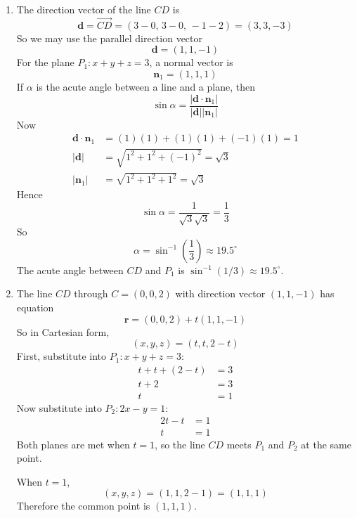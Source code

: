 \documentclass[leqno]{article}
\begin{document}
\begin{enumerate}[
  label=\textbf{\arabic*.},
  leftmargin=*,
  topsep=0pt,
  partopsep=0pt,
  parsep=0pt
]
\begin{tcolorbox}[colback=white, colframe=scarlet, title={\textbf{Solution}}, breakable, grow to left by=6mm, grow to right by=10mm]
\begin{enumerate}[label=\textbf{(\alph*)}]
  \item The direction vector of the line $CD$ is
\[
\mathbf d=\overrightarrow{CD}=(3-0,\,3-0,\,-1-2)=(3,3,-3)
\]
So we may use the parallel direction vector
\[
\mathbf d=(1,1,-1)
\]
For the plane $P_1:x+y+z=3$, a normal vector is
\[
\mathbf n_1=(1,1,1)
\]
If $\alpha$ is the acute angle between a line and a plane, then
\[
\sin\alpha=\frac{\left\lvert \mathbf d\cdot \mathbf n_1\right\rvert}{\left\lvert \mathbf d\right\rvert\left\lvert \mathbf n_1\right\rvert}
\]
Now
\begin{align*}
\mathbf d\cdot \mathbf n_1&=(1)(1)+(1)(1)+(-1)(1)=1 \\
\left\lvert \mathbf d\right\rvert&=\sqrt{1^2+1^2+(-1)^2}=\sqrt{3} \\
\left\lvert \mathbf n_1\right\rvert&=\sqrt{1^2+1^2+1^2}=\sqrt{3}
\end{align*}
Hence
\[
\sin\alpha=\frac{1}{\sqrt{3}\sqrt{3}}=\frac{1}{3}
\]
So
\[
\alpha=\sin^{-1}\!\left(\frac13\right)\approx 19.5^\circ
\]
The acute angle between $CD$ and $P_1$ is $\sin^{-1}(1/3)\approx 19.5^\circ$.

  \item The line $CD$ through $C=(0,0,2)$ with direction vector $(1,1,-1)$ has equation
\[
\mathbf r=(0,0,2)+t(1,1,-1)
\]
So in Cartesian form,
\[
(x,y,z)=(t,t,2-t)
\]
First, substitute into $P_1:x+y+z=3$:
\begin{align*}
t+t+(2-t)&=3 \\
t+2&=3 \\
t&=1
\end{align*}
Now substitute into $P_2:2x-y=1$:
\begin{align*}
2t-t&=1 \\
t&=1
\end{align*}
Both planes are met when $t=1$, so the line $CD$ meets $P_1$ and $P_2$ at the same point.

When $t=1$,
\[
(x,y,z)=(1,1,2-1)=(1,1,1)
\]
Therefore the common point is $(1,1,1)$.


\end{enumerate}
\end{tcolorbox}
\end{enumerate}
\end{document}
